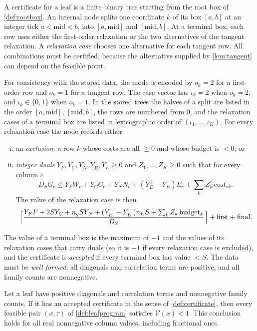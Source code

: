 \begin{definition}[Certificate]\label{def:certificate}
A certificate for a leaf is a finite binary tree starting from the root box of
\cref{def:rootbox}. An internal node splits one coordinate $k$ of
its box $[a,b]$ at an integer tick $a<\mathrm{mid}<b$, into $[a,\mathrm{mid}]$ and
$[\mathrm{mid},b]$. At a terminal box, each row uses either the first-order relaxation
or the two alternatives of the tangent relaxation. A \emph{relaxation case} chooses one
alternative for each tangent row. All combinations must be certified, because the
alternative supplied by \cref{lem:tangent} can depend on the feasible point.

For consistency with the stored data, the mode is encoded by $o_k=2$ for a first-order
row and $o_k=1$ for a tangent row. The case vector has $\iota_k=2$ when $o_k=2$, and
$\iota_k\in\{0,1\}$ when $o_k=1$. In the stored trees the halves of a split are listed in the
order $[a,\mathrm{mid}]$, $[\mathrm{mid},b]$, the rows are numbered from $0$, and the relaxation
cases of a terminal box are listed in lexicographic order of $(\iota_1,\dots,\iota_K)$.
For every relaxation case the node records either
\begin{enumerate}[(i)]
  \item an \emph{exclusion}: a row $k$ whose costs are all $\ge0$ and whose budget is $<0$; or
  \item \emph{integer duals} $Y_F,Y_C,Y_N,Y_E^+,Y_E^-\ge0$ and $Z_1,\dots,Z_K\ge0$ such that for every
    column $c$
    \begin{equation}\label{eq:dualfeasible}
      D_SG_c\le Y_FW_c+Y_CC_c+Y_NN_c+(Y_E^+-Y_E^-)E_c+\sum_kZ_k\,\mathrm{cost}_{ck}.
    \end{equation}
    The value of the relaxation case is then
    \[
      \Bigl\lceil\frac{Y_FF+2SY_C+n_gSY_N+(Y_E^+-Y_E^-)n_ES+\sum_kZ_k\,\mathrm{budget}_k}{D_S}\Bigr\rceil
      +\mathrm{first}+\mathrm{final}.
    \]
\end{enumerate}
The value of a terminal box is the maximum of $-1$ and the values of its relaxation cases that
carry duals (so it is $-1$ if every relaxation case is excluded), and
the certificate is \emph{accepted} if every terminal box has value $<S$. The data must be
\emph{well formed}: all diagonals and correlation terms are positive, and all family counts are
nonnegative.
\end{definition}

\begin{theorem}\label{thm:certificate}
Let a leaf have positive diagonals and correlation terms and nonnegative family counts. If it has
an accepted certificate in the sense of \cref{def:certificate}, then every feasible
pair $(x,\tau)$ of \cref{def:leafprogram} satisfies $\mathcal V(x)<1$.
This conclusion holds for all real nonnegative column values, including fractional ones.
\end{theorem}

